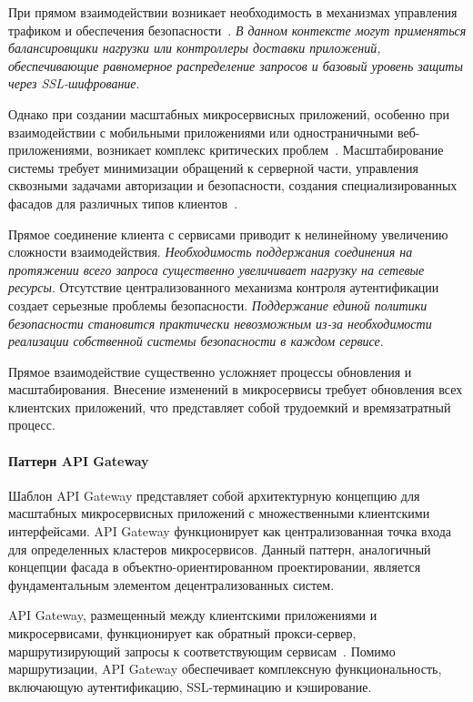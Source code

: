 При прямом взаимодействии возникает необходимость в механизмах управления трафиком и обеспечения безопасности~\cite{trebichavsky2021}. \textit{В данном контексте могут применяться балансировщики нагрузки или контроллеры доставки приложений, обеспечивающие равномерное распределение запросов и базовый уровень защиты через SSL-шифрование}.

Однако при создании масштабных микросервисных приложений, особенно при взаимодействии с мобильными приложениями или одностраничными веб-приложениями, возникает комплекс критических проблем~\cite{microsoft_api_gateway}. Масштабирование системы требует минимизации обращений к серверной части, управления сквозными задачами авторизации и безопасности, создания специализированных фасадов для различных типов клиентов~\cite{newman2015building}.

Прямое соединение клиента с сервисами приводит к нелинейному увеличению сложности взаимодействия. \textit{Необходимость поддержания соединения на протяжении всего запроса существенно увеличивает нагрузку на сетевые ресурсы}.
Отсутствие централизованного механизма контроля аутентификации создает серьезные проблемы безопасности. \textit{Поддержание единой политики безопасности становится практически невозможным из-за необходимости реализации собственной системы безопасности в каждом сервисе}.

Прямое взаимодействие существенно усложняет процессы обновления и масштабирования.
Внесение изменений в микросервисы требует обновления всех клиентских приложений, что представляет собой трудоемкий и времязатратный процесс.

\paragraph{Паттерн API Gateway}

Шаблон API Gateway представляет собой архитектурную концепцию для масштабных микросервисных приложений с множественными клиентскими интерфейсами.
API Gateway функционирует как централизованная точка входа для определенных кластеров микросервисов. Данный паттерн, аналогичный концепции фасада в объектно-ориентированном проектировании, является фундаментальным элементом децентрализованных систем.

API Gateway, размещенный между клиентскими приложениями и микросервисами, функционирует как обратный прокси-сервер, маршрутизирующий запросы к соответствующим сервисам~\cite{zhao2018management}. Помимо маршрутизации, API Gateway обеспечивает комплексную функциональность, включающую аутентификацию, SSL-терминацию и кэширование.

